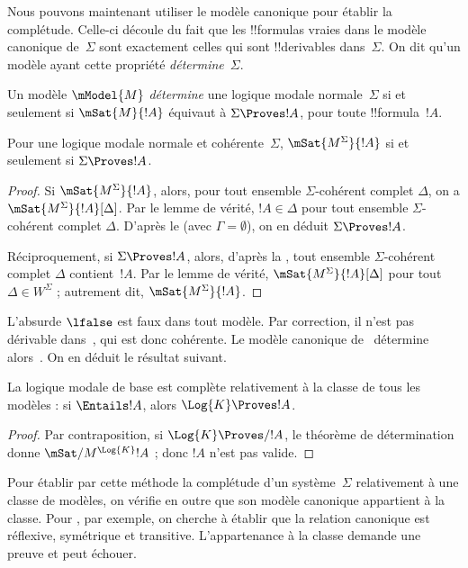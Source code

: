 \documentclass[../../../include/open-logic-section]{subfiles}
\begin{document}


Nous pouvons maintenant utiliser le modèle canonique pour établir la
complétude. Celle-ci découle du fait que les !!{formula}s vraies dans
le modèle canonique de~$\Sigma$ sont exactement celles qui sont
!!{derivable}s dans~$\Sigma$. On dit qu'un modèle ayant cette propriété
\emph{détermine}~$\Sigma$.

\begin{defn}
  Un modèle $\mModel{M}$ \emph{détermine} une logique modale
  normale~$\Sigma$ si et seulement si $\mSat{M}{!A}$ équivaut à $\Sigma
  \Proves !A$, pour toute !!{formula}~$!A$.
\end{defn}

\begin{thm}[Détermination]
  Pour une logique modale normale et cohérente~$\Sigma$, $\mSat{M^\Sigma}{!A}$ si et seulement si $\Sigma \Proves !A$.
\end{thm}

\begin{proof}
  Si $\mSat{M^\Sigma}{!A}$, alors, pour tout ensemble $\Sigma$-cohérent
  complet $\Delta$, on a $\mSat{M^\Sigma}{!A}[\Delta]$. Par le
  lemme de vérité, $!A \in \Delta$ pour tout ensemble $\Sigma$-cohérent
  complet $\Delta$. D'après le
   (avec $\Gamma =
  \emptyset$), on en déduit $\Sigma \Proves !A$.

  Réciproquement, si $\Sigma \Proves !A$, alors, d'après la
  , tout
  ensemble $\Sigma$-cohérent complet $\Delta$ contient~$!A$. Par le
  lemme de vérité, $\mSat{M^\Sigma}{!A}[\Delta]$ pour tout~$\Delta \in
  W^\Sigma$ ; autrement dit, $\mSat{M^\Sigma}{!A}$.
\end{proof}

L'absurde $\lfalse$ est faux dans tout modèle. Par correction,
il n'est pas dérivable dans~, qui est donc cohérente.
Le modèle canonique de~ détermine alors~. On en déduit
le résultat suivant.

\begin{cor}
  La logique modale de base  est complète relativement à la
  classe de tous les modèles : si $\Entails !A$, alors $\Log{K}
  \Proves !A$.
\end{cor}

\begin{proof}
  Par contraposition, si $\Log{K} \Proves/ !A$, le théorème de
  détermination donne $\mSat/{M^{\Log{K}}}{!A}$ ; donc $!A$ n'est pas
  valide.
\end{proof}

Pour établir par cette méthode la complétude d'un système~$\Sigma$
relativement à une classe de modèles, on vérifie en outre que son
modèle canonique appartient à la classe. Pour , par exemple,
on cherche à établir que la relation canonique est réflexive,
symétrique et transitive. L'appartenance à la classe demande une
preuve et peut échouer.
\end{document}
